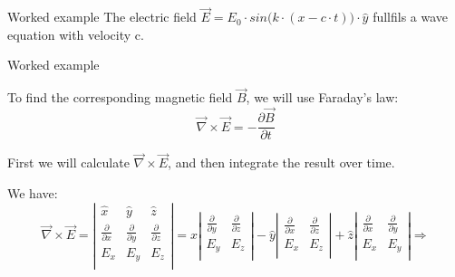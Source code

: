 {\begin{frame}{Worked example}
The electric field $\displaystyle \vec{E} = E_{0} \cdot sin\Big(k \cdot (x-c \cdot t)\Big) \cdot \hat{y}$
fullfils a wave equation with velocity c.

\end{frame}


%
%
%
%

\begin{frame}{Worked example}

To find the corresponding magnetic field $\vec{B}$, we will use Faraday's law:
\begin{equation*}
  \vec{\nabla} \times \vec{E} = - \frac{\partial \vec{B}}{\partial t}
\end{equation*}

First we will calculate $\vec{\nabla} \times \vec{E}$,
and then integrate the result over time.\\

\vspace{0.2cm}

We have:
\begin{equation*}
  \vec{\nabla} \times \vec{E} =
   \left|
    \begin{array}{ccc}
      \hat{x}                     & \hat{y}                     & \hat{z} \\
      \frac{\partial}{\partial x} & \frac{\partial}{\partial y} & \frac{\partial}{\partial z} \\
       E_{x}                      &  E_{y}                      &  E_{z} \\
    \end{array}
   \right| =
   \hat{x}
   \left|
    \begin{array}{cc}
      \frac{\partial}{\partial y} & \frac{\partial}{\partial z} \\
       E_{y}                      &  E_{z} \\
    \end{array}
   \right| -
   \hat{y}
   \left|
    \begin{array}{cc}
      \frac{\partial}{\partial x} & \frac{\partial}{\partial z} \\
       E_{x}                      &  E_{z} \\
    \end{array}
   \right| +
   \hat{z}
   \left|
    \begin{array}{cc}
      \frac{\partial}{\partial x} & \frac{\partial}{\partial y} \\
       E_{x}                      &  E_{y}                      \\
    \end{array}
   \right| \Rightarrow
\end{equation*}


\end{frame}}
